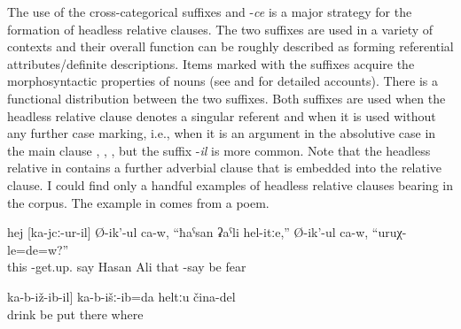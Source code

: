The use of the cross-categorical suffixes  and -\textit{ce} is a major strategy for the formation of headless relative clauses. The two suffixes are used in a variety of contexts and their overall function can be roughly described as forming referential attributes\slash definite descriptions. Items marked with the suffixes acquire the morphosyntactic properties of nouns (see  and  for detailed accounts). There is a functional distribution between the two suffixes. Both suffixes are used when the headless relative clause denotes a singular referent and when it is used without any further case marking, i.e., when it is an argument in the absolutive case in the main clause  , , , but the suffix -\textit{il} is more common. Note that the headless relative in  contains a further adverbial clause that is embedded into the relative clause. I could find only a handful examples of headless relative clauses bearing  in the corpus. The example in  comes from a poem.  

%
\begin{exe}
	\ex	\label{ex:The one who is standing says}
	\gll	hej	[ka-jcː-ur-il]	Ø-ik'-ul	ca-w, ``ħaˁsan	ʡaˁli	hel-itːe,''	Ø-ik'-ul	ca-w,	``uruχ-le=de=w?''\\
		this	-get.up.	say	 Hasan	Ali	that	-say	be	fear\\
	\glt	{}

	\ex	\label{ex:‎The one where they are sitting and drinking, I put this (picture) somewhere}
	\gll	[[b-učː-ul]	ka-b-iž-ib-il]	ka-b-išː-ib=da	heltːu	čina-del\\
		drink	be	put	there where\\
	\glt	{}
\end{exe}

